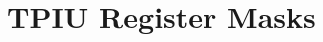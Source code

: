 \hypertarget{group___t_p_i_u___register___masks}{}\section{T\+P\+I\+U Register Masks}
\label{group___t_p_i_u___register___masks}
